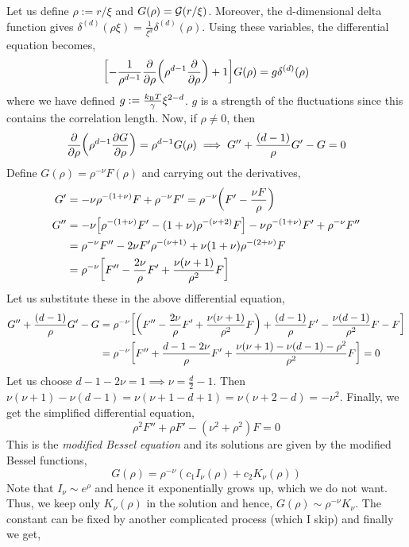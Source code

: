 Let us define $\rho := r/\xi$ and $G(\rho) = \mathcal G(r/\xi)$. Moreover, the d-dimensional delta function gives $\delta^{(d)}(\rho \xi) = \frac{1}{\xi^d}\delta^{(d)}(\rho)$. Using these variables, the differential equation becomes, 
$$\qty[ -\frac{1}{\rho^{d-1}} \pdv{\rho}\qty(\rho^{d-1}\pdv{\rho}) + 1 ] G(\vb{\rho}) = g \delta^{(d)}(\vb{\rho})$$
where we have defined $g:= \frac{k_{\text{\tiny B}} T}{\gamma}\xi^{2-d}$. $g$ is a strength of the fluctuations since this contains the correlation length. Now, if $\rho\neq 0$, then 
$$  \pdv{\rho}\qty(\rho^{d-1}\pdv{G}{\rho}) =\rho^{d-1} G(\vb{\rho})\implies  G''+\frac{(d-1)}{\rho} G' -G=0$$
Define $G(\rho) = \rho^{-\nu}F(\rho)$ and carrying out the derivatives,
\begin{equation}
    \begin{split}
        G' &= -\nu \rho^{-(1+\nu)}F + \rho^{-\nu}F' = \rho^{-\nu}\qty(F' - \frac{\nu F}{\rho})\\
        G'' &= -\nu\qty[\rho^{-(1+\nu)}F' - (1+\nu)\rho^{-(\nu+2)}F] - \nu \rho^{-(1+\nu)}F' + \rho^{-\nu}F''\\
        &=\rho^{-\nu}F'' - 2\nu F'\rho^{-(\nu+1)} + \nu(1+\nu)\rho^{-(2+\nu)}F\\
        &=\rho^{-\nu}\qty[F'' -\frac{2\nu}{\rho}F' + \frac{\nu(\nu+1)}{\rho^2}F]
     \end{split}
\end{equation}
Let us substitute these in the above differential equation, 
\begin{align}
    \begin{split}
        G'' + \frac{(d-1)}{\rho}G' - G &= \rho^{-\nu}\qty[\qty(F'' -\frac{2\nu}{\rho}F' +\frac{\nu(\nu+1)}{\rho^2}F) +\frac{(d-1)}{\rho}F' - \frac{\nu(d-1)}{\rho^2}F - F] \\
        &=\rho^{-\nu}\qty[F'' + \frac{d-1-2\nu}{\rho}F' +\frac{\nu(\nu+1) - \nu(d-1)-\rho^2}{\rho^2}F]=0
    \end{split}
\end{align}
Let us choose $d-1-2\nu = 1 \implies \nu = \frac{d}{2}-1$. Then $\nu(\nu+1) - \nu(d-1) =\nu(\nu+1-d+1) = \nu(\nu+2-d) = -\nu^2$. Finally, we get the simplified differential equation, 
$$\rho^2 F'' +\rho F' -(\nu^2 + \rho^2)F=0$$
This is the \textit{modified Bessel equation} and its solutions are given by the modified Bessel functions, 
$$G(\rho) = \rho^{-\nu}(c_1 I_{\nu}(\rho)+c_2 K_{\nu}(\rho))$$
Note that $I_\nu \sim e^\rho$ and hence it exponentially grows up, which we do not want. Thus, we keep only $K_{\nu}(\rho)$ in the solution and hence, $G(\rho) \sim \rho^{-\nu}K_\nu$. The constant can be fixed by another complicated process (which I skip) and finally we get, 
